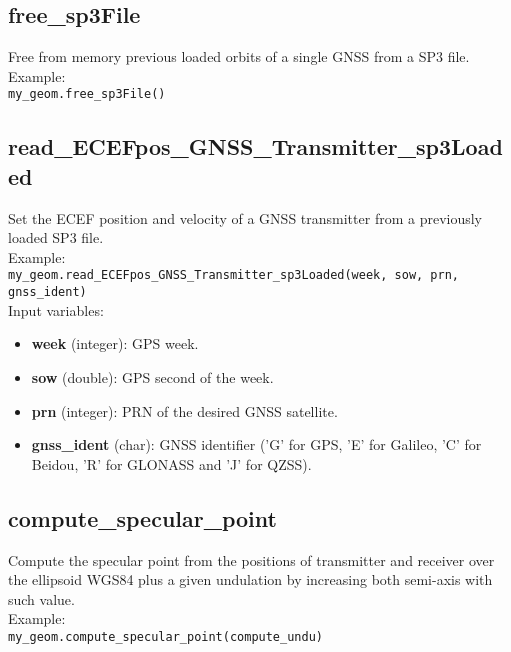 \subsection{free\_sp3File}

Free from memory previous loaded orbits of a single GNSS from a SP3 file.\\

Example:\\

\texttt{my\_geom.free\_sp3File()}\\


\subsection{read\_ECEFpos\_GNSS\_Transmitter\_sp3Loaded}

Set the ECEF position and velocity of a GNSS transmitter from a previously loaded SP3 file.\\

Example:\\

\texttt{my\_geom.read\_ECEFpos\_GNSS\_Transmitter\_sp3Loaded(week, sow, prn, gnss\_ident)}\\

Input variables:
\begin{itemize}
\item {\bf week} (integer): GPS week.
\item {\bf sow} (double): GPS second of the week.
\item {\bf prn} (integer): PRN of the desired GNSS satellite.
\item {\bf gnss\_ident} (char): GNSS identifier ('G' for GPS, 'E' for Galileo, 'C' for Beidou, 'R' for GLONASS and 'J' for QZSS).
\end{itemize}


\subsection{compute\_specular\_point}

Compute the specular point from the positions of transmitter and receiver over the ellipsoid WGS84 plus a given undulation by increasing both semi-axis with such value.\\

Example:\\

\texttt{my\_geom.compute\_specular\_point(compute\_undu)}\\

